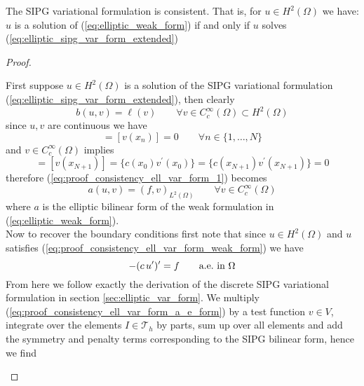 \begin{theorem}
	The SIPG variational formulation is consistent. That is, for $u \in H^2(\Omega)$ we have: \\
	$u$ is a solution of (\ref{eq:elliptic_weak_form}) if and only if $u$ solves (\ref{eq:elliptic_sipg_var_form_extended})
\end{theorem}
\begin{proof}
	\begin{proofstep}["$\Leftarrow$"]
		\noindent First suppose $u\in H^2(\Omega)$ is a solution of the SIPG variational formulation (\ref{eq:elliptic_sipg_var_form_extended}), then clearly 
		\begin{equation}
			\label{eq:proof_consistency_ell_var_form_1}
			b(u,v) = \ell(v) \qquad \forall v \in C_c^{\infty}(\Omega) \subset H^2(\Omega)
		\end{equation}
		since $u,v$ are continuous we have 
		\begin{equation*}
		[u(x_n)] = [v(x_n)] = 0 \qquad  \forall n \in \{1,\ldots,N\}	
		\end{equation*}
		and $v \in C_c^{\infty}(\Omega)$ implies 
		\begin{equation*}
		[v(x_0)] = [v(x_{N+1})] = \{c(x_0)v^{\prime}(x_0)\} = \{c(x_{N+1})v^{\prime}(x_{N+1})\} = 0	
		\end{equation*}
		therefore (\ref{eq:proof_consistency_ell_var_form_1}) becomes
		\begin{equation}
			\label{eq:proof_consistency_ell_var_form_weak_form}
			a(u,v) = (f,v)_{L^2(\Omega)} \qquad \forall v \in C_c^{\infty}(\Omega)
		\end{equation}
		where $a$ is the elliptic bilinear form of the weak formulation in (\ref{eq:elliptic_weak_form}). \\
		Now to recover the boundary conditions first note that since $u \in H^2(\Omega)$ and  $u$ satisfies (\ref{eq:proof_consistency_ell_var_form_weak_form}) 
		we have 
		\begin{equation}
			\label{eq:proof_consistency_ell_var_form_a_e_form}
			-(c\, u')' = f \qquad \text{a.e.\@ in } \Omega  
		\end{equation}
		From here we follow exactly the derivation of the discrete SIPG variational formulation in section \ref{sec:elliptic_var_form}.
		We multiply (\ref{eq:proof_consistency_ell_var_form_a_e_form}) by a test function $v \in V$, integrate over the elements $I \in \mathcal{T}_h$ by parts, 
		sum up over all elements and add the symmetry and penalty terms corresponding to the SIPG bilinear form, hence we find

\end{proofstep}
\end{proof}
